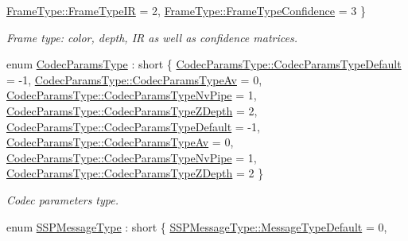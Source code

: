 \begin{DoxyCompactItemize}
\hyperlink{namespacemoetsi_1_1ssp_a46efdfa2cd5a28ead465dcc8006b5a87a2c799f7416882b538fa8295567f65cf5}{Frame\+Type\+::\+Frame\+Type\+IR} = 2, 
\hyperlink{namespacemoetsi_1_1ssp_a46efdfa2cd5a28ead465dcc8006b5a87a1b85b2c60b857778932e29e0e5021ba1}{Frame\+Type\+::\+Frame\+Type\+Confidence} = 3
 \}\begin{DoxyCompactList}\small\item\em Frame type\+: color, depth, IR as well as confidence matrices. \end{DoxyCompactList}
\item 
enum \hyperlink{namespacemoetsi_1_1ssp_a6d638ba0bd38e9daded08f633d893563}{Codec\+Params\+Type} \+: short \{ \newline
\hyperlink{namespacemoetsi_1_1ssp_a6d638ba0bd38e9daded08f633d893563a1ffd3a6c06641b95d3e5142403ed0730}{Codec\+Params\+Type\+::\+Codec\+Params\+Type\+Default} = -\/1, 
\hyperlink{namespacemoetsi_1_1ssp_a6d638ba0bd38e9daded08f633d893563a55e78e5ce82b1d5dcfbb2381af26698f}{Codec\+Params\+Type\+::\+Codec\+Params\+Type\+Av} = 0, 
\hyperlink{namespacemoetsi_1_1ssp_a6d638ba0bd38e9daded08f633d893563ac818f912b0dd4cd2868a1a03d5c570a1}{Codec\+Params\+Type\+::\+Codec\+Params\+Type\+Nv\+Pipe} = 1, 
\hyperlink{namespacemoetsi_1_1ssp_a6d638ba0bd38e9daded08f633d893563a4e738f8ec62ed2fd5d5675f71b291992}{Codec\+Params\+Type\+::\+Codec\+Params\+Type\+Z\+Depth} = 2, 
\newline
\hyperlink{namespacemoetsi_1_1ssp_a6d638ba0bd38e9daded08f633d893563a1ffd3a6c06641b95d3e5142403ed0730}{Codec\+Params\+Type\+::\+Codec\+Params\+Type\+Default} = -\/1, 
\hyperlink{namespacemoetsi_1_1ssp_a6d638ba0bd38e9daded08f633d893563a55e78e5ce82b1d5dcfbb2381af26698f}{Codec\+Params\+Type\+::\+Codec\+Params\+Type\+Av} = 0, 
\hyperlink{namespacemoetsi_1_1ssp_a6d638ba0bd38e9daded08f633d893563ac818f912b0dd4cd2868a1a03d5c570a1}{Codec\+Params\+Type\+::\+Codec\+Params\+Type\+Nv\+Pipe} = 1, 
\hyperlink{namespacemoetsi_1_1ssp_a6d638ba0bd38e9daded08f633d893563a4e738f8ec62ed2fd5d5675f71b291992}{Codec\+Params\+Type\+::\+Codec\+Params\+Type\+Z\+Depth} = 2
 \}\begin{DoxyCompactList}\small\item\em Codec parameters type. \end{DoxyCompactList}
\item 
enum \hyperlink{namespacemoetsi_1_1ssp_a8948545ffe48a5b3507fd10a1e56d546}{S\+S\+P\+Message\+Type} \+: short \{ \hyperlink{namespacemoetsi_1_1ssp_a8948545ffe48a5b3507fd10a1e56d546a16d065ca1ae16532bc3115ec68734080}{S\+S\+P\+Message\+Type\+::\+Message\+Type\+Default} = 0, 

\end{DoxyCompactItemize}
